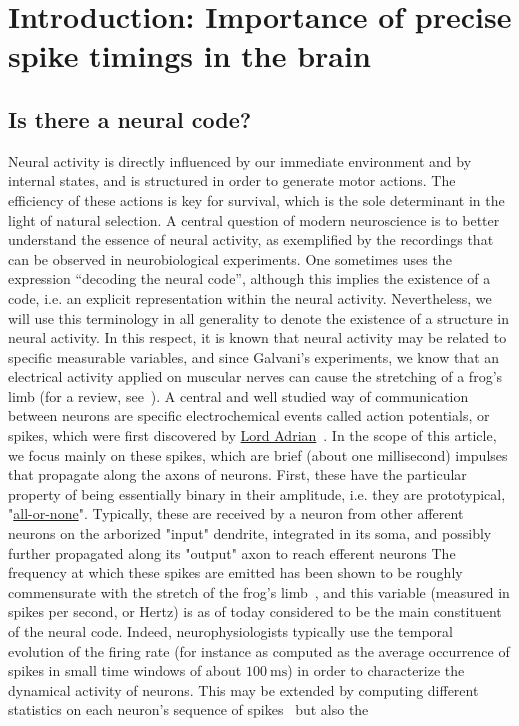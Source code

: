 \documentclass[brainsci, %
               review,submit,pdftex,moreauthors
               ]{Definitions/mdpi}
\newcommand{\ms}{\si{\milli\second}}%
\begin{document}
%
\section{Introduction: Importance of precise spike timings in the brain}\label{sec:time}
%
\subsection{Is there a neural code?}
Neural activity is directly influenced by our immediate environment and by internal states, and is structured in order to generate motor actions. The efficiency of these actions is key for survival, which is the sole determinant in the light of natural selection. A central question of modern neuroscience is to better understand the essence of neural activity, as exemplified by the recordings that can be observed in neurobiological experiments. One sometimes uses the expression ``decoding the neural code'', although this implies the existence of a code, i.e. an explicit representation within the neural activity. Nevertheless, we will use this terminology in all generality to denote the existence of a structure in neural activity. In this respect, it is known that neural activity may be related to specific measurable variables, and since Galvani's experiments, we know that an electrical activity applied on muscular nerves can cause the stretching of a frog's limb (for a review, see~\citep{piccolino_luigi_1997}). A central and well studied way of communication between neurons are specific electrochemical events called action potentials, or spikes, which were first discovered by \href{https://en.wikipedia.org/wiki/Edgar_Adrian}{Lord Adrian}~\citep{adrian_impulses_1926}. In the scope of this article, we focus mainly on these spikes, which are brief (about one millisecond) impulses that propagate along the axons of neurons. First, these have the particular property of being essentially binary in their amplitude, i.e. they are prototypical, "\href{https://en.wikipedia.org/wiki/All-or-none_law}{all-or-none}". Typically, these are received by a neuron from other afferent neurons on the arborized "input" dendrite, integrated in its soma, and possibly further propagated along its "output" axon to reach efferent neurons The frequency at which these spikes are emitted has been shown to be roughly commensurate with the stretch of the frog's limb~\citep{adrian_impulses_1926}, and this variable (measured in spikes per second, or Hertz) is as of today considered to be the main constituent of the neural code. Indeed, neurophysiologists typically use the temporal evolution of the firing rate (for instance as computed as the average occurrence of spikes in small time windows of about $100~\ms$) in order to characterize the dynamical activity of neurons. This may be extended by computing different statistics on each neuron's sequence of spikes~\citep{perkel_neuronal_1967} but also the 
\end{document}
